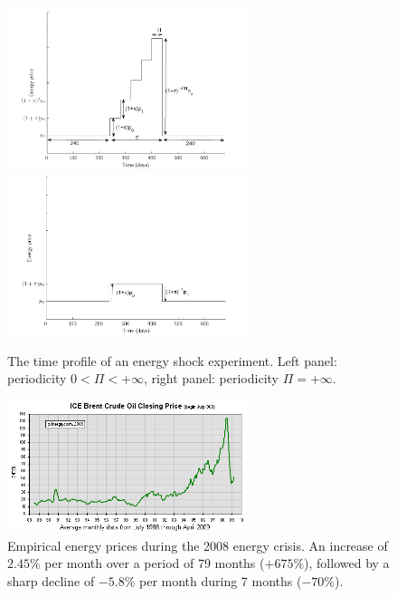 \begin{figure}[th]
\centering\leavevmode
\begin{boxedminipage}{15cm}
\centering\leavevmode
\includegraphics[width=7cm]{./energy_shock/png/energy.png}
\includegraphics[width=7cm]{./energy_shock/png/energy_single.png}
\end{boxedminipage}
\caption{The time profile of an energy shock experiment. Left panel:
periodicity $0<\Pi<+\infty $, right panel: periodicity $\Pi=+\infty $.}
\label{Figure: energy shock}
\end{figure}

\begin{figure}[ht!]
\centering\leavevmode
\begin{boxedminipage}{10.5cm}
\centering\leavevmode
\includegraphics[width=7cm]{./energy_shock/png/Brent_1988_2009.png}
\end{boxedminipage}
\caption{Empirical energy prices during the 2008 energy crisis. An increase
of $2.45\%$ per month over a period of 79 months ($+675\%$), followed by a
sharp decline of $-5.8\%$ per month during 7 months ($-70\%$).}
\label{Figure: empirical energy shock}
\end{figure}

